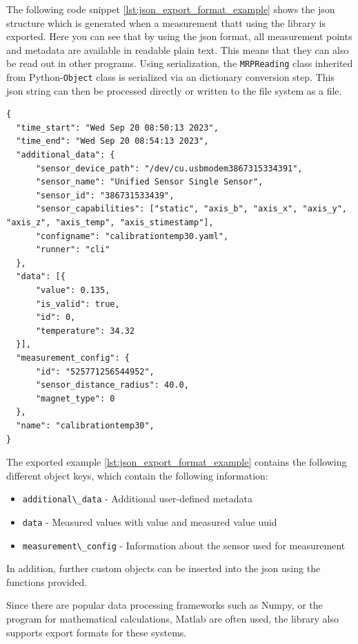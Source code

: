 The following code snippet \ref{lst:json_export_format_example} shows
the \gls{json} structure which is generated when a measurement thatt
using the library is exported. Here you can see that by using the
\gls{json} format, all measurement points and metadata are available in
readable plain text. This means that they can also be read out in other
programs. Using serialization, the \passthrough{\lstinline!MRPReading!}
class inherited from Python-\passthrough{\lstinline!Object!} class is
serialized via an dictionary conversion step. This \gls{json} string can
then be processed directly or written to the file system as a file.

\begin{lstlisting}[caption={JSON export structure of an MRPReading based measurement}, label=lst:json_export_format_example]
{
  "time_start": "Wed Sep 20 08:50:13 2023",
  "time_end": "Wed Sep 20 08:54:13 2023",
  "additional_data": {
      "sensor_device_path": "/dev/cu.usbmodem3867315334391",
      "sensor_name": "Unified Sensor Single Sensor",
      "sensor_id": "386731533439",
      "sensor_capabilities": ["static", "axis_b", "axis_x", "axis_y", "axis_z", "axis_temp", "axis_stimestamp"],
      "configname": "calibrationtemp30.yaml",
      "runner": "cli"
  },
  "data": [{
      "value": 0.135,
      "is_valid": true,
      "id": 0,
      "temperature": 34.32
  }],
  "measurement_config": {
      "id": "525771256544952",
      "sensor_distance_radius": 40.0,
      "magnet_type": 0
  },
  "name": "calibrationtemp30",
}
\end{lstlisting}

The exported example \ref{lst:json_export_format_example} contains the
following different object keys, which contain the following
information:

\begin{itemize}
\tightlist
\item
  \passthrough{\lstinline!additional\_data!} - Additional user-defined
  metadata
\item
  \passthrough{\lstinline!data!} - Measured values with value and
  measured value \gls{uuid}
\item
  \passthrough{\lstinline!measurement\_config!} - Information about the
  sensor used for measurement
\end{itemize}

In addition, further custom objects can be inserted into the \gls{json}
using the functions provided.

Since there are popular data processing frameworks such as
Numpy\cite{harris2020array}, or the program for mathematical
calculations, Matlab are often used, the library also supports export
formats for these systems.


